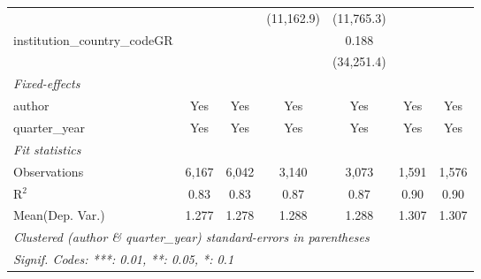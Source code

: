 \begin{tabular}{lcccccc}
                                         &                &                & (11,162.9)    & (11,765.3)    &                &   \\   
   institution\_country\_codeGR          &                &                &               & 0.188         &                &   \\   
                                         &                &                &               & (34,251.4)    &                &   \\   
   \midrule
   \emph{Fixed-effects}\\
   author                                & Yes            & Yes            & Yes           & Yes           & Yes            & Yes\\  
   quarter\_year                         & Yes            & Yes            & Yes           & Yes           & Yes            & Yes\\  
   \midrule
   \emph{Fit statistics}\\
   Observations                          & 6,167          & 6,042          & 3,140         & 3,073         & 1,591          & 1,576\\  
   R$^2$                                 & 0.83           & 0.83           & 0.87          & 0.87          & 0.90           & 0.90\\  
Mean(Dep. Var.) & 1.277 & 1.278 & 1.288 & 1.288 & 1.307 & 1.307 \\
   \midrule \midrule
   \multicolumn{7}{l}{\emph{Clustered (author \& quarter\_year) standard-errors in parentheses}}\\
   \multicolumn{7}{l}{\emph{Signif. Codes: ***: 0.01, **: 0.05, *: 0.1}}\\
\end{tabular}
\par\endgroup
